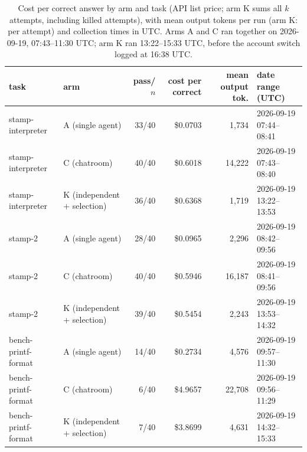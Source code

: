\begin{table}[t]
\centering
\caption{Cost per correct answer by arm and task (API list price; arm K sums all $k$ attempts, including killed attempts), with mean output tokens per run (arm K: per attempt) and collection times in UTC. Arms A and C ran together on 2026-09-19, 07:43--11:30 UTC; arm K ran 13:22--15:33 UTC, before the account switch logged at 16:38 UTC.}
\label{tab:cost-per-correct}
\begin{tabular}{llrrrl}
\toprule
task & arm & pass/$n$ & cost per correct & mean output tok. & date range (UTC) \\
\midrule
stamp-interpreter & A (single agent) & 33/40 & \$0.0703 & 1,734 & 2026-09-19 07:44--08:41 \\
stamp-interpreter & C (chatroom) & 40/40 & \$0.6018 & 14,222 & 2026-09-19 07:43--08:40 \\
stamp-interpreter & K (independent + selection) & 36/40 & \$0.6368 & 1,719 & 2026-09-19 13:22--13:53 \\
stamp-2 & A (single agent) & 28/40 & \$0.0965 & 2,296 & 2026-09-19 08:42--09:56 \\
stamp-2 & C (chatroom) & 40/40 & \$0.5946 & 16,187 & 2026-09-19 08:41--09:56 \\
stamp-2 & K (independent + selection) & 39/40 & \$0.5454 & 2,243 & 2026-09-19 13:53--14:32 \\
bench-printf-format & A (single agent) & 14/40 & \$0.2734 & 4,576 & 2026-09-19 09:57--11:30 \\
bench-printf-format & C (chatroom) & 6/40 & \$4.9657 & 22,708 & 2026-09-19 09:56--11:29 \\
bench-printf-format & K (independent + selection) & 7/40 & \$3.8699 & 4,631 & 2026-09-19 14:32--15:33 \\
\bottomrule
\end{tabular}
\end{table}
